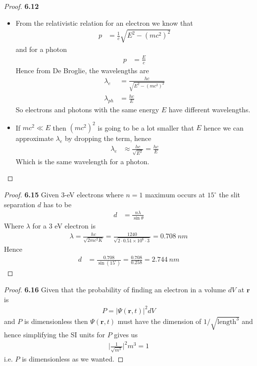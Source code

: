 \documentclass[11pt]{article}
\theoremstyle{definition}
\begin{document}
\begin{proof}{\textbf{6.12}}
\begin{itemize}
    \item [(a)] From the relativistic relation for an electron we know that
    \begin{align*}
        p &= \frac{1}{c}\sqrt{E^2 - (mc^2)^2}
    \end{align*}
    and for a photon
    \begin{align*}
        p &= \frac{E}{c}
    \end{align*}
    Hence from De Broglie, the wavelengths are
    \begin{align*}
        \lambda_e &= \frac{hc}{\sqrt{E^2 - (mc^2)^2}}\\
        \lambda_{ph} &= \frac{hc}{E}
    \end{align*}
    So electrons and photons with the same energy $E$ have different
    wavelengths.
    \item [(b)] If $mc^2 \ll E$ then $(mc^2)^2$ is going to be a lot smaller
    that $E$ hence we can approximate $\lambda_e$ by dropping the term, hence 
    \begin{align*}
        \lambda_e &\approx \frac{hc}{\sqrt{E^2}} = \frac{hc}{E}
    \end{align*}
    Which is the same wavelength for a photon.
\end{itemize}
\end{proof}
\begin{proof}{\textbf{6.15}}
    Given $3$-eV electrons where $n = 1$ maximum occurs at $15^\circ$ the slit
    separation $d$ has to be
    \begin{align*}
        d &= \frac{n\lambda}{\sin\theta}
    \end{align*}
    Where $\lambda$ for a 3 eV electron is 
    \begin{align*}
        \lambda = \frac{hc}{\sqrt{2 mc^2 K}}
        = \frac{1240}{\sqrt{2 \cdot 0.51 \times 10^6 \cdot 3}}
        = 0.708~nm
    \end{align*}
    Hence
    \begin{align*}
        d &= \frac{0.708}{\sin(15^\circ)} = \frac{0.708}{0.258} = 2.744~nm
    \end{align*}
\end{proof}
\cleardoublepage
\begin{proof}{\textbf{6.16}}
    Given that the probability of finding an electron in a volume $dV$ at
    $\bm{r}$ is
    \begin{align*}
        P = |\Psi(\bm{r}, t)|^2 dV
    \end{align*}
    and $P$ is dimensionless then $\Psi(\bm{r}, t)$ must have the dimension
    of $1/\sqrt{\text{length}^3}$ and hence simplifying the SI units for $P$
    gives us
    \begin{align*}
        \bigg|\frac{1}{\sqrt{m^3}}\bigg|^2 m^3 = 1
    \end{align*} 
    i.e. $P$ is dimensionless as we wanted.
\end{proof}
\end{document}
